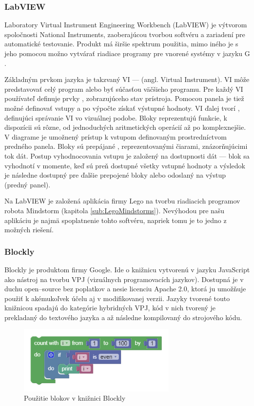 \subsubsection{LabVIEW}
Laboratory Virtual Instrument Engineering Workbench (LabVIEW) je výtvorom spoločnosti National Instruments, zaoberajúcou tvorbou softvéru a zariadení pre automatické testovanie. Produkt má širšie spektrum použitia, mimo iného je s jeho pomocou možno vytvárať riadiace programy pre vnorené systémy v jazyku G \cite{LabVIEW}.

Základným prvkom jazyka je takzvaný VI ---  (angl. Virtual Instrument). VI môže predstavovať celý program alebo byť súčasťou väčšieho programu. Pre každý VI používateľ definuje prvky , zobrazujúceho stav prístroja. Pomocou panela je tiež možné definovať vstupy a po výpočte získať výstupné hodnoty. VI ďalej tvorí , definujúci správanie VI vo vizuálnej podobe. Bloky reprezentujú funkcie, k dispozícii sú rôzne, od jednoduchých aritmetických operácií až po komplexnejšie. V diagrame je umožnený prístup k vstupom definovaným prostredníctvom predného panela. Bloky sú prepájané , reprezentovanými čiarami, znázorňujúcimi tok dát. Postup vyhodnocovania vstupu je založený na dostupnosti dát --- blok sa vyhodnotí v momente, keď sú preň dostupné všetky vstupné hodnoty a výsledok je následne dostupný pre ďalšie prepojené bloky alebo odoslaný na výstup (predný panel).

Na LabVIEW je založená aplikácia firmy Lego na tvorbu riadiacich programov robota Mindstorm (kapitola \ref{sub:LegoMindstorms}). Nevýhodou pre našu aplikáciu je najmä spoplatnenie tohto softvéru, napriek tomu je to jedno z možných riešení.

\subsubsection{Blockly}
Blockly je produktom firmy Google. Ide o knižnicu vytvorenú v jazyku JavaScript ako nástroj na tvorbu VPJ (vizuálnych programovacích jazykov). Dostupná je v duchu open--source bez poplatkov a nesie licenciu Apache 2.0, ktorá ju umožňuje použiť k akémukoľvek účelu aj v modifikovanej verzii. Jazyky tvorené touto knižnicou spadajú do kategórie hybridných VPJ, kód v nich tvorený je prekladaný do textového jazyka a až následne kompilovaný do strojového kódu.

\begin{figure}
\centerline{\includegraphics[width=0.7\textwidth]{images/blocky-example}}
\caption[Použitie blokov v knižnici Blockly]{Použitie blokov v knižnici Blockly}
\label{obr:blockly-example}
\end{figure}

